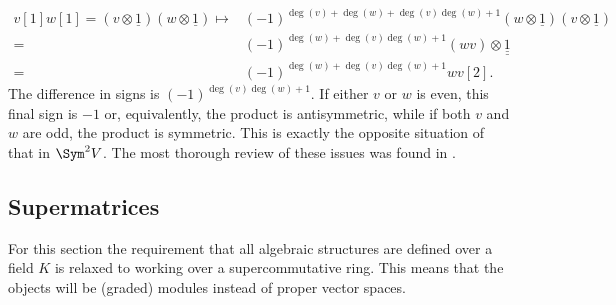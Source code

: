 \begin{remark}
        \begin{align*}
            v[1]w[1]=(v\otimes\underline{1})(w\otimes\underline{1})\mapsto&(-1)^{\deg(v)+\deg(w)+\deg(v)\deg(w)+1}(w\otimes\underline{1})(v\otimes\underline{1})\\
            =&(-1)^{\deg(w)+\deg(v)\deg(w)+1}(wv)\otimes\underline{\underline{1}}\\
            =&(-1)^{\deg(w)+\deg(v)\deg(w)+1}wv[2].
        \end{align*}
        The difference in signs is $(-1)^{\deg(v)\deg(w)+1}$. If either $v$ or $w$ is even, this final sign is $-1$ or, equivalently, the product is antisymmetric, while if both $v$ and $w$ are odd, the product is symmetric. This is exactly the opposite situation of that in $\Sym^2V$. The most thorough review of these issues was found in \cite{MitiAntonioMichele2021Hcmi}.
    \end{remark}

\subsection{Supermatrices}

    For this section the requirement that all algebraic structures are defined over a field $K$ is relaxed to working over a supercommutative ring. This means that the objects will be (graded) modules instead of proper vector spaces.

